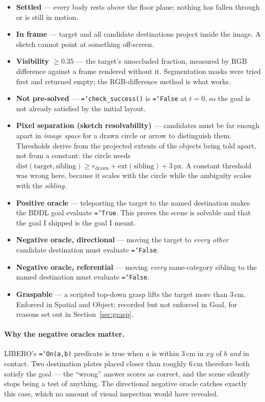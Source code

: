 \documentclass[11pt,a4paper]{article}
\newcommand{\code}[1]{\texttt{\small\hyphenchar\font=`\-\relax #1}}
\begin{document}
\begin{itemize}
\item \textbf{Settled} --- every body rests above the floor plane; nothing has
  fallen through or is still in motion.
\item \textbf{In frame} --- target and all candidate destinations project inside
  the image. A sketch cannot point at something off-screen.
\item \textbf{Visibility $\geq 0.35$} --- the target's unoccluded fraction,
  measured by RGB difference against a frame rendered without it. Segmentation
  masks were tried first and returned empty; the RGB-difference method is what
  works.
\item \textbf{Not pre-solved} --- \code{check\_success()} is \code{False} at
  $t=0$, so the goal is not already satisfied by the initial layout.
\item \textbf{Pixel separation (sketch resolvability)} --- candidates must be far
  enough apart in \emph{image space} for a drawn circle or arrow to distinguish
  them. Thresholds derive from the projected extents of the objects being told
  apart, not from a constant: the circle needs
  $\mathrm{dist}(\text{target},\text{sibling}) \geq r_{\text{drawn}} +
  \mathrm{ext}(\text{sibling}) + 3\,\text{px}$. A constant threshold was wrong
  here, because it scales with the circle while the ambiguity scales with the
  \emph{sibling}.
\item \textbf{Positive oracle} --- teleporting the target to the named
  destination makes the BDDL goal evaluate \code{True}. This proves the scene is
  solvable and that the goal I shipped is the goal I meant.
\item \textbf{Negative oracle, directional} --- moving the target to
  \emph{every other} candidate destination must evaluate \code{False}.
\item \textbf{Negative oracle, referential} --- moving \emph{every} same-category
  sibling to the named destination must evaluate \code{False}.
\item \textbf{Graspable} --- a scripted top-down grasp lifts the target more than
  3\,cm. Enforced in Spatial and Object; recorded but not enforced in Goal, for
  reasons set out in Section~\ref{sec:grasp}.
\end{itemize}

\paragraph{Why the negative oracles matter.}
LIBERO's \code{On(a,b)} predicate is true when $a$ is within 3\,cm in $xy$ of $b$
\emph{and} in contact. Two destination plates placed closer than roughly 6\,cm
therefore both satisfy the goal --- the ``wrong'' answer scores as correct, and
the scene silently stops being a test of anything. The directional negative
oracle catches exactly this case, which no amount of visual inspection would
have revealed.
\end{document}
